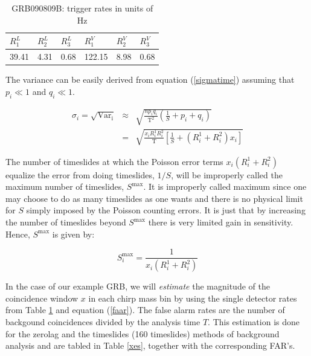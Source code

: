 \documentclass[epsf]{article}
\begin{document}
\begin{table}[ht]
 \begin{tabular}{|l|l|l|l|l|l|}
 \hline
 \hline
 $R_{1}^L$ & $R_{2}^L$ & $R_{3}^L$ & $R_{1}^V$ & $R_{2}^V$ & $R_{3}^V$ \\
 \hline
 39.41 & 4.31 & 0.68 & 122.15 & 8.98 & 0.68 \\
 \hline 
 \hline
 \end{tabular} 
 \caption{GRB090809B: trigger rates in units of Hz}
 \label{rates}
\end{table}


The variance can be easily derived from equation (\ref{sigmatime}) assuming that $p_i \ll 1$ and $q_i \ll 1$. 

\begin{eqnarray}
\sigma_i = \sqrt{\mathrm{Var_i}} &\approx& \sqrt{\frac{np_iq_i}{\mathrm{T}^2}(\frac{1}{S} + p_i + q_i)} \nonumber\\ 
                                 &=& \sqrt{\frac{x_iR_{i}^1 R_{i}^2}{\mathrm{T}}[ \frac{1}{S} + (R_{i}^1 + R_{i}^2) x_i ]}
\label{far_variance}
\end{eqnarray}

The number of timeslides at which the Poisson error terms $x_i(R_{i}^1 + R_{i}^2)$ equalize the error from doing timeslides, $1/S$, will be improperly called the maximum number of timeslides, $S^{\mathrm{max}}$. It is improperly called maximum since one may choose to do as many timeslides as one wants and there is no physical limit for $S$ simply imposed by the Poisson counting errors. It is just that by increasing the number of timeslides beyond $S^{\mathrm{max}}$ there is very limited gain in sensitivity. Hence, $S^{\mathrm{max}}$ is given by:

\begin{equation}
S^{\mathrm{max}}_i = \frac{1}{x_i(R_{i}^1 + R_{i}^2)}
\label{timeslidesmax}
\end{equation}

In the case of our example GRB, we will \emph{estimate} the magnitude of the coincidence window $x$ in each chirp mass bin by using the single detector rates from Table \ref{rates} and equation (\ref{faar}). The false alarm rates are the number of backgound coincidences divided by the analysis time $T$. This estimation is done for the zerolag and the timeslides (160 timeslides) methods of background analysis and are tabled in Table \ref{xes}, together with the corresponding FAR's.
\end{document}
